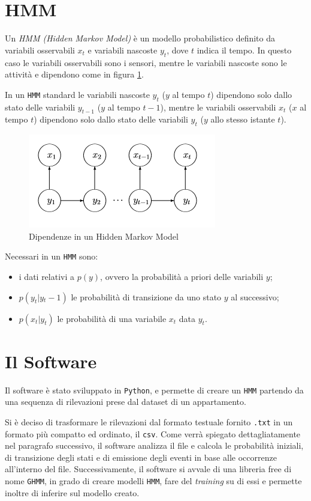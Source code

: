 \documentclass[12pt, a4paper]{scrartcl}
\begin{document}
\section*{HMM}
Un \emph{HMM (Hidden Markov Model)} è un modello probabilistico definito da variabili osservabili $x_t$ e variabili nascoste $y_t$, dove $t$ indica il tempo. In questo caso le variabili osservabili sono i sensori, mentre le variabili nascoste sono le attività e dipendono come in figura \ref{fig:dependece-hmm}. 

In un \texttt{HMM} standard le variabili nascoste $y_t$ ($y$ al tempo $t$) dipendono solo dallo stato delle variabili $y_{t-1}$ ($y$ al tempo $t-1$), mentre le variabili osservabili $x_t$ ($x$ al tempo $t$) dipendono solo dallo stato delle variabili $y_t$ ($y$ allo stesso istante $t$).
\begin{figure}[!ht]
	\centering
	\includegraphics[scale=1]{HMM.png} 
	\caption{Dipendenze in un Hidden Markov Model}
	\label{fig:dependece-hmm}
\end{figure}

Necessari in un \texttt{HMM} sono: 
\begin{itemize}
\item i dati relativi a $p(y)$, ovvero la probabilità a priori delle variabili $y$; 
\item $p(y_t|y{_t-1})$ le probabilità di transizione da uno stato $y$ al successivo; 
\item $p(x_t|y_t)$ le probabilità di una variabile $x_t$ data $y_t$.
\end{itemize}

\section*{Il Software}
Il software è stato sviluppato in \texttt{Python}, e permette di creare un \texttt{HMM} partendo da una sequenza di rilevazioni prese dal dataset di un appartamento. 

Si è deciso di trasformare le rilevazioni dal formato testuale fornito \texttt{.txt} in un formato più compatto ed ordinato, il \texttt{csv}. Come verrà spiegato dettagliatamente nel paragrafo successivo, il software analizza il file e calcola le probabilità iniziali, di transizione degli stati e di emissione degli eventi in base alle occorrenze all'interno del file. Successivamente, il software si avvale di una libreria free di nome \texttt{GHMM}, in grado di creare modelli \texttt{HMM}, fare del \emph{training} su di essi e permette inoltre di inferire sul modello creato.
\end{document}
